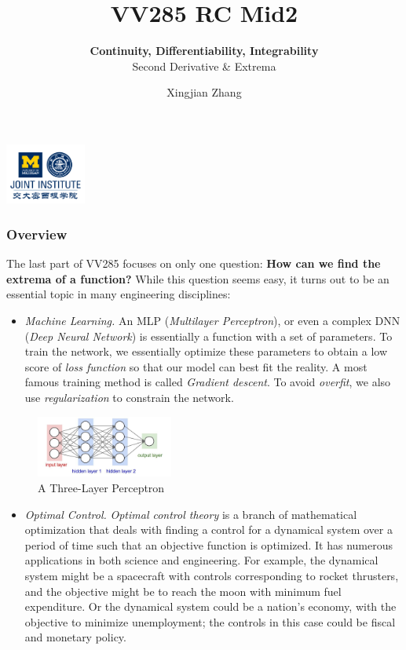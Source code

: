 \documentclass[11pt, t]{beamer}
\title{VV285 RC Mid2}
\subtitle{\textbf{Continuity, Differentiability, Integrability}\\\large  Second Derivative \& Extrema}
\institute[UM-SJTU JI]{Univerity of Michigan-Shanghai Jiao Tong University Joint Institute}
\author{Xingjian Zhang}
\renewcommand{\emph}[1]{{\color{Turquoise3}\textsl{#1}}}
\begin{document}
\begin{frame}
    \titlepage
    \begin{center}
        \includegraphics[height=2cm]{Figures/logo/logo2.png}
    \end{center}
\end{frame}

\begin{frame}[allowframebreaks]
    \frametitle{Overview}
    The last part of VV285 focuses on only one question: \textbf{How can we find the extrema of a function?} While this question seems easy, it turns out to be an essential topic in many engineering disciplines:
    \begin{itemize}
        \item \emph{Machine Learning.} An MLP (\textit{Multilayer Perceptron}), or even a complex DNN (\textit{Deep Neural Network}) is essentially a function with a set of parameters. To train the network, we essentially optimize these parameters to obtain a low score of \textit{loss function} so that our model can best fit the reality. A most famous training method is called \textit{Gradient descent}. To avoid \textit{overfit}, we also use \textit{regularization} to constrain the network.
    \end{itemize}
    \begin{figure}[H]
        \centering
        \includegraphics[width=0.4\textwidth]{Figures/2020-07-28-20-42-04.png}
        \caption{A Three-Layer Perceptron}
    \end{figure}
    \newpage
    \begin{itemize}
        \item \emph{Optimal Control.} \textit{Optimal control theory} is a branch of mathematical optimization that deals with finding a control for a dynamical system over a period of time such that an objective function is optimized. It has numerous applications in both science and engineering. For example, the dynamical system might be a spacecraft with controls corresponding to rocket thrusters, and the objective might be to reach the moon with minimum fuel expenditure. Or the dynamical system could be a nation's economy, with the objective to minimize unemployment; the controls in this case could be fiscal and monetary policy.

\end{itemize}
\end{frame}
\end{document}
